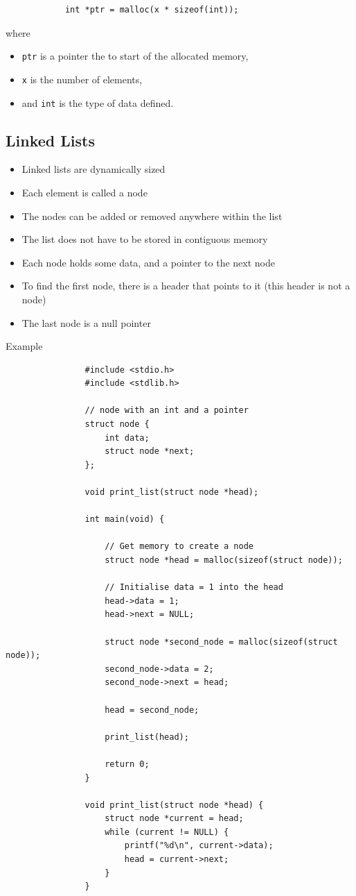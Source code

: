 \documentclass{article}
\begin{document}
		\begin{verbatim}
			int *ptr = malloc(x * sizeof(int));
		\end{verbatim}

		where
		\begin{itemize}
			\item \texttt{ptr} is a pointer the to start of the allocated memory,
			\item \texttt{x} is the number of elements,
			\item and \texttt{int} is the type of data defined.
		\end{itemize}

	\subsection{Linked Lists}

		\begin{itemize}
			\item Linked lists are dynamically sized
			\item Each element is called a node
			\item The nodes can be added or removed anywhere within the list
			\item The list does not have to be stored in contiguous memory
			\item Each node holds some data, and a pointer to the next node
			\item To find the first node, there is a header that points to it (this header is not a node)
			\item The last node is a null pointer
		\end{itemize}

		\begin{question}{Example}
			
			\begin{verbatim}
				#include <stdio.h>
				#include <stdlib.h>

				// node with an int and a pointer
				struct node {
					int data;
					struct node *next;
				};

				void print_list(struct node *head);
				
				int main(void) {

					// Get memory to create a node
					struct node *head = malloc(sizeof(struct node));

					// Initialise data = 1 into the head
					head->data = 1;
					head->next = NULL;

					struct node *second_node = malloc(sizeof(struct node));
					second_node->data = 2;
					second_node->next = head;

					head = second_node;

					print_list(head);

					return 0;
				}

				void print_list(struct node *head) {
					struct node *current = head;
					while (current != NULL) {
						printf("%d\n", current->data);
						head = current->next;
					}
				}

			\end{verbatim}

		\end{question}
\end{document}
